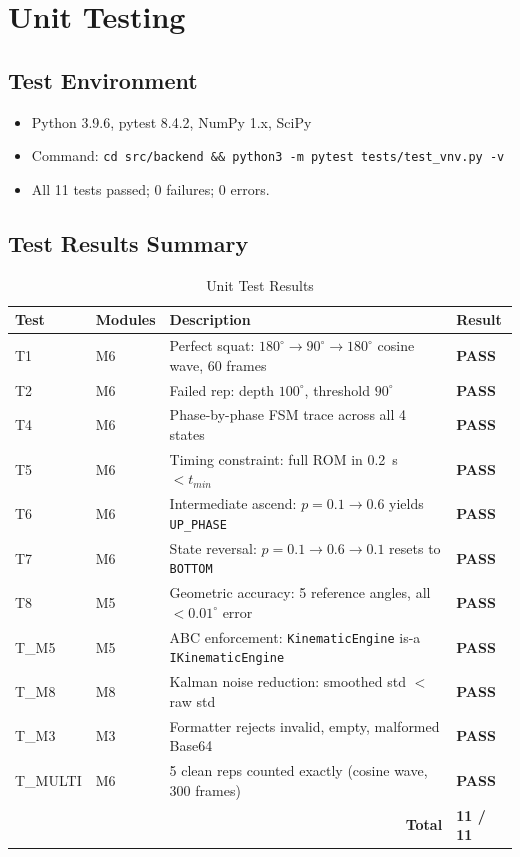 \documentclass[12pt, titlepage]{article}
\newcommand{\ppass}{\textcolor{green!60!black}{\textbf{PASS}}}
\begin{document}
\section{Unit Testing}
\label{sec:unit}

\subsection{Test Environment}

\begin{itemize}
  \item Python 3.9.6, pytest 8.4.2, NumPy 1.x, SciPy
  \item Command: \texttt{cd src/backend \&\& python3 -m pytest tests/test\_vnv.py -v}
  \item All 11 tests passed; 0 failures; 0 errors.
\end{itemize}

\subsection{Test Results Summary}

\begin{table}[H]
\centering
\begin{tabular}{l l p{6.2cm} l}
\toprule
\textbf{Test} & \textbf{Modules} & \textbf{Description} & \textbf{Result}\\
\midrule
T1        & M6     & Perfect squat: $180^\circ \to 90^\circ \to 180^\circ$ cosine wave, 60 frames & \ppass \\
T2        & M6     & Failed rep: depth $100^\circ$, threshold $90^\circ$ & \ppass \\
T4        & M6     & Phase-by-phase FSM trace across all 4 states        & \ppass \\
T5        & M6     & Timing constraint: full ROM in 0.2~s $< t_{min}$    & \ppass \\
T6        & M6     & Intermediate ascend: $p{=}0.1{\to}0.6$ yields \texttt{UP\_PHASE} & \ppass \\
T7        & M6     & State reversal: $p{=}0.1{\to}0.6{\to}0.1$ resets to \texttt{BOTTOM} & \ppass \\
T8        & M5     & Geometric accuracy: 5 reference angles, all $< 0.01^\circ$ error & \ppass \\
T\_M5     & M5     & ABC enforcement: \texttt{KinematicEngine} is-a \texttt{IKinematicEngine} & \ppass \\
T\_M8     & M8     & Kalman noise reduction: smoothed std $<$ raw std    & \ppass \\
T\_M3     & M3     & Formatter rejects invalid, empty, malformed Base64  & \ppass \\
T\_MULTI  & M6     & 5 clean reps counted exactly (cosine wave, 300 frames) & \ppass \\
\midrule
\multicolumn{3}{r}{\textbf{Total}} & \textbf{11 / 11}\\
\bottomrule
\end{tabular}
\caption{Unit Test Results}
\label{tab:allresults}
\end{table}
\end{document}
